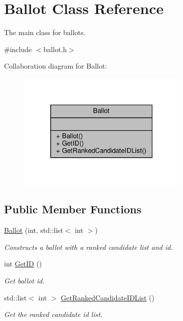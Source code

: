 \hypertarget{classBallot}{}\section{Ballot Class Reference}
\label{classBallot}


The main class for ballots.  




{\ttfamily \#include $<$ballot.\+h$>$}



Collaboration diagram for Ballot\+:\nopagebreak
\begin{figure}[H]
\begin{center}
\leavevmode
\includegraphics[width=232pt]{classBallot__coll__graph}
\end{center}
\end{figure}
\subsection*{Public Member Functions}
\begin{DoxyCompactItemize}
\item 
\hyperlink{classBallot_a890f4b9091da6f3836b5730d640869f8}{Ballot} (int, std\+::list$<$ int $>$)
\begin{DoxyCompactList}\small\item\em Constructs a ballot with a ranked candidate list and id. \end{DoxyCompactList}\item 
int \hyperlink{classBallot_ab918e416b8b0981b82b20b9df1d7ba51}{Get\+ID} ()
\begin{DoxyCompactList}\small\item\em Get ballot id. \end{DoxyCompactList}\item 
std\+::list$<$ int $>$ \hyperlink{classBallot_a5107d9df309cc5b7ff4a237799e3bff5}{Get\+Ranked\+Candidate\+I\+D\+List} ()
\begin{DoxyCompactList}\small\item\em Get the ranked candidate id list. \end{DoxyCompactList}\end{DoxyCompactItemize}



